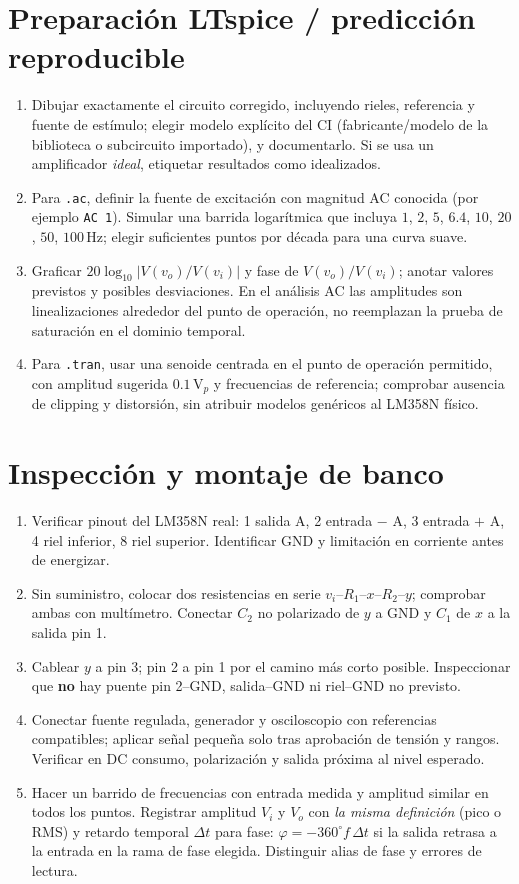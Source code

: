 \documentclass[10pt,a4paper]{article}
\begin{document}
\section{Preparación LTspice / predicción reproducible}
\begin{enumerate}[label=\textbf{Paso \arabic*.}]
\item Dibujar exactamente el circuito corregido, incluyendo rieles, referencia y fuente de estímulo; elegir modelo explícito del CI (fabricante/modelo de la biblioteca o subcircuito importado), y documentarlo. Si se usa un amplificador \emph{ideal}, etiquetar resultados como idealizados.
\item Para \texttt{.ac}, definir la fuente de excitación con magnitud AC conocida (por ejemplo \texttt{AC 1}). Simular una barrida logarítmica que incluya $1$, $2$, $5$, $6.4$, $10$, $20$, $50$, $100\,\mathrm{Hz}$; elegir suficientes puntos por década para una curva suave.
\item Graficar $20\log_{10}|V(v_o)/V(v_i)|$ y fase de $V(v_o)/V(v_i)$; anotar valores previstos y posibles desviaciones. En el análisis AC las amplitudes son linealizaciones alrededor del punto de operación, no reemplazan la prueba de saturación en el dominio temporal.
\item Para \texttt{.tran}, usar una senoide centrada en el punto de operación permitido, con amplitud sugerida $0.1\,\mathrm{V}_p$ y frecuencias de referencia; comprobar ausencia de clipping y distorsión, sin atribuir modelos genéricos al LM358N físico.
\end{enumerate}
\section{Inspección y montaje de banco}
\begin{enumerate}[label=\textbf{Paso \arabic*.}]
\item Verificar pinout del LM358N real: 1 salida A, 2 entrada $-$ A, 3 entrada $+$ A, 4 riel inferior, 8 riel superior. Identificar GND y limitación en corriente antes de energizar.
\item Sin suministro, colocar dos resistencias en serie $v_i$–$R_1$–$x$–$R_2$–$y$; comprobar ambas con multímetro. Conectar $C_2$ no polarizado de $y$ a GND y $C_1$ de $x$ a la salida pin 1.
\item Cablear $y$ a pin 3; pin 2 a pin 1 por el camino más corto posible. Inspeccionar que \textbf{no} hay puente pin 2–GND, salida–GND ni riel–GND no previsto.
\item Conectar fuente regulada, generador y osciloscopio con referencias compatibles; aplicar señal pequeña solo tras aprobación de tensión y rangos. Verificar en DC consumo, polarización y salida próxima al nivel esperado.
\item Hacer un barrido de frecuencias con entrada medida y amplitud similar en todos los puntos. Registrar amplitud $V_{i}$ y $V_o$ con \emph{la misma definición} (pico o RMS) y retardo temporal $\Delta t$ para fase: $\varphi=-360^\circ f\,\Delta t$ si la salida retrasa a la entrada en la rama de fase elegida. Distinguir alias de fase y errores de lectura.
\end{enumerate}
\end{document}
